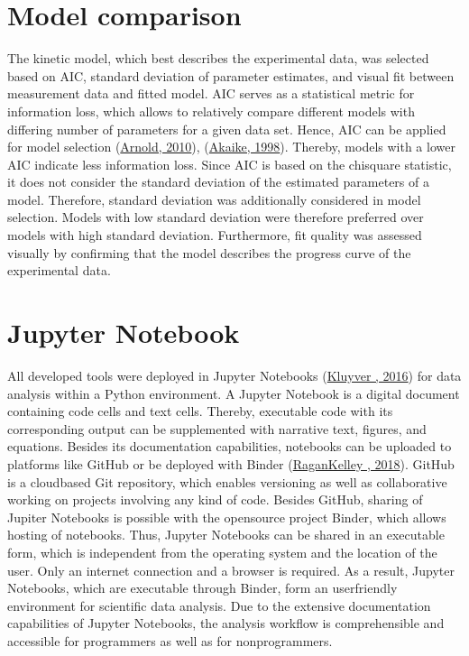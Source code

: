 \documentclass[letterpaper,12pt,english]{jupyterBook}
\begin{document}
\section{Model comparison}
\label{\detokenize{methods:model-comparison}}
\sphinxAtStartPar
The kinetic model, which best describes the experimental data, was selected based on AIC, standard deviation of parameter estimates, and visual fit between measurement data and fitted model. AIC serves as a statistical metric for information loss, which allows to relatively compare different models with differing number of parameters for a given data set. Hence, AIC can be applied for model selection (\hyperlink{cite.references:id16}{Arnold, 2010}), (\hyperlink{cite.references:id17}{Akaike, 1998}). Thereby, models with a lower AIC indicate less information loss.
Since AIC is based on the chi\sphinxhyphen{}square statistic, it does not consider the standard deviation of the estimated parameters of a model. Therefore, standard deviation was additionally considered in model selection. Models with low standard deviation were therefore preferred over models with high standard deviation. Furthermore, fit quality was assessed visually by confirming that the model describes the progress curve of the experimental data.


\section{Jupyter Notebook}
\label{\detokenize{methods:jupyter-notebook}}
\sphinxAtStartPar
All developed tools were deployed in Jupyter Notebooks (\hyperlink{cite.references:id37}{Kluyver , 2016}) for data analysis within a Python environment. A Jupyter Notebook is a digital document containing code cells and text cells. Thereby, executable code with its corresponding output can be supplemented with narrative text, figures, and equations.
Besides its documentation capabilities, notebooks can be uploaded to platforms like GitHub or be deployed with Binder (\hyperlink{cite.references:id20}{Ragan\sphinxhyphen{}Kelley , 2018}).
GitHub is a cloud\sphinxhyphen{}based Git repository, which enables versioning as well as collaborative working on projects involving any kind of code. Besides GitHub, sharing of Jupiter Notebooks is possible with the open\sphinxhyphen{}source project Binder, which allows hosting of notebooks. Thus, Jupyter Notebooks can be shared in an executable form, which is independent from the operating system and the location of the user. Only an internet connection and a browser is required.
As a result, Jupyter Notebooks, which are executable through Binder, form an user\sphinxhyphen{}friendly environment for scientific data analysis. Due to the extensive documentation capabilities of Jupyter Notebooks, the analysis workflow is comprehensible and accessible for programmers as well as for non\sphinxhyphen{}programmers.
\end{document}
